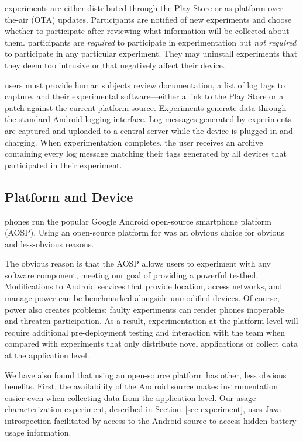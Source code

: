 \PhoneLab{} experiments are either distributed through the Play Store or as
platform over-the-air (OTA) updates. Participants are notified of new
experiments and choose whether to participate after reviewing what
information will be collected about them. \PhoneLab{} participants are
\textit{required} to participate in experimentation but \textit{not required}
to participate in any particular experiment. They may uninstall experiments
that they deem too intrusive or that negatively affect their device.

\PhoneLab{} users must provide human subjects review documentation, a list of
log tags to capture, and their experimental software---either a link to the
Play Store or a patch against the current \PhoneLab{} platform source.
Experiments generate data through the standard Android logging interface. Log
messages generated by \PhoneLab{} experiments are captured and uploaded to a
central server while the device is plugged in and charging. When
experimentation completes, the user receives an archive containing every log
message matching their tags generated by all \PhoneLab{} devices that
participated in their experiment.

\subsection{Platform and Device}

\PhoneLab{} phones run the popular Google Android open-source smartphone
platform (AOSP). Using an open-source platform for \PhoneLab{} was an obvious
choice for obvious and less-obvious reasons.

The obvious reason is that the AOSP allows \PhoneLab{} users to experiment
with any software component, meeting our goal of providing a powerful
testbed. Modifications to Android services that provide location, access
networks, and manage power can be benchmarked alongside unmodified devices.
Of course, power also creates problems: faulty experiments can render phones
inoperable and threaten participation. As a result, experimentation at the
platform level will require additional pre-deployment testing and interaction
with the \PhoneLab{} team when compared with experiments that only distribute
novel applications or collect data at the application level.

We have also found that using an open-source platform has other, less obvious
benefits. First, the availability of the Android source makes \PhoneLab{}
instrumentation easier even when collecting data from the application level.
Our usage characterization experiment, described in
Section~\ref{sec-experiment}, uses Java introspection facilitated by access
to the Android source to access hidden battery usage information.

